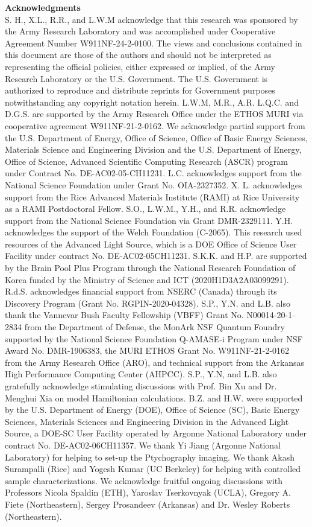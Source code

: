 \documentclass[12pt]{article}
\begin{document}
\noindent\textbf{Acknowledgments}\\
S. H., X.L., R.R., and L.W.M acknowledge that this research was sponsored by the Army Research Laboratory and was accomplished under Cooperative Agreement Number W911NF-24-2-0100. The views and conclusions contained in this document are those of the authors and should not be interpreted as representing the official policies, either expressed or implied, of the Army Research Laboratory or the U.S. Government. The U.S. Government is authorized to reproduce and distribute reprints for Government purposes notwithstanding any copyright notation herein. L.W.M, M.R., A.R. L.Q.C. and D.G.S. are supported by the Army Research Office under the ETHOS MURI via cooperative agreement W911NF-21-2-0162. We acknowledge partial support from the U.S. Department of Energy, Office of Science, Office of Basic Energy Sciences, Materials Science and Engineering Division and the U.S. Department of Energy, Office of Science, Advanced Scientific Computing Research (ASCR) program under Contract No. DE-AC02-05-CH11231. L.C. acknowledges support from the National Science Foundation under Grant No. OIA-2327352. X. L. acknowledges support from the Rice Advanced Materials Institute (RAMI) at Rice University as a RAMI Postdoctoral Fellow. S.O., L.W.M., Y.H., and R.R. acknowledge support from the National Science Foundation via Grant DMR-2329111. Y.H. acknowledges the support of the Welch Foundation (C-2065). This research used resources of the Advanced Light Source, which is a DOE Office of Science User Facility under contract No. DE-AC02-05CH11231. S.K.K. and H.P. are supported by the Brain Pool Plus Program through the National Research Foundation of Korea funded by the Ministry of Science and ICT (2020H1D3A2A03099291). R.d.S. acknowledges financial support from NSERC (Canada) through its Discovery Program (Grant No. RGPIN-2020-04328).  
S.P., Y.N. and L.B. also thank the Vannevar Bush Faculty Fellowship (VBFF) Grant No. N00014-20-1–2834 from the Department of Defense, the MonArk NSF Quantum Foundry supported by the National Science Foundation Q-AMASE-i Program under NSF Award No. DMR-1906383, the MURI
ETHOS Grant No. W911NF-21-2-0162 from the Army Research Office (ARO), and technical support from the Arkansas High Performance Computing Center (AHPCC). S.P., Y.N, and L.B. also gratefully acknowledge stimulating discussions with Prof. Bin Xu and Dr. Menghui Xia on model Hamiltonian calculations.
B.Z. and H.W. were supported by the U.S. Department of Energy (DOE), Office of Science (SC), Basic Energy Sciences, Materials Sciences and Engineering Division in the Advanced Light Source, a DOE-SC User Facility operated by Argonne National Laboratory under contract No. DE-AC02-06CH11357. We thank Yi Jiang (Argonne National Laboratory) for helping to set-up the Ptychography imaging. We thank Akash Surampalli (Rice) and Yogesh Kumar (UC Berkeley) for helping with controlled sample characterizations. We acknowledge fruitful ongoing discussions with Professors Nicola Spaldin (ETH), Yaroslav Tserkovnyak (UCLA), Gregory A. Fiete (Northeastern), Sergey Prosandeev (Arkansas) and Dr. Wesley Roberts (Northeastern). \\
\end{document}
